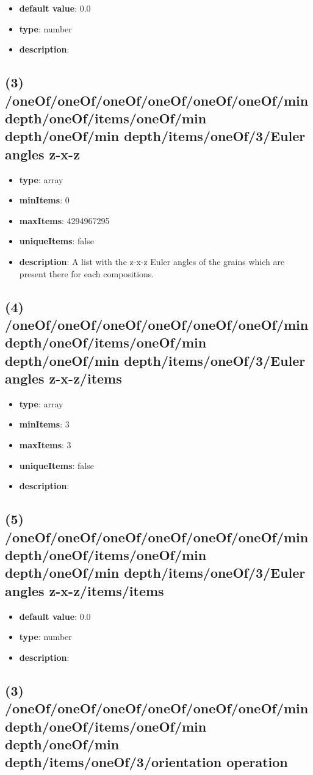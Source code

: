 \begin{itemize}[leftmargin=6em]\item {\bf default value}: 0.0
\item {\bf type}: number
\item {\bf description}: 
\end{itemize}\subsection{(3) /oneOf/oneOf/oneOf/oneOf/oneOf/oneOf/min depth/oneOf/items/oneOf/min depth/oneOf/min depth/items/oneOf/3/Euler angles z-x-z}
\begin{itemize}[leftmargin=3em]\item {\bf type}: array
\item {\bf minItems}: 0
\item {\bf maxItems}: 4294967295
\item {\bf uniqueItems}: false
\item {\bf description}: A list with the z-x-z Euler angles of the grains which are present there for each compositions.
\end{itemize}\subsection{(4) /oneOf/oneOf/oneOf/oneOf/oneOf/oneOf/min depth/oneOf/items/oneOf/min depth/oneOf/min depth/items/oneOf/3/Euler angles z-x-z/items}
\begin{itemize}[leftmargin=4em]\item {\bf type}: array
\item {\bf minItems}: 3
\item {\bf maxItems}: 3
\item {\bf uniqueItems}: false
\item {\bf description}: 
\end{itemize}\subsection{(5) /oneOf/oneOf/oneOf/oneOf/oneOf/oneOf/min depth/oneOf/items/oneOf/min depth/oneOf/min depth/items/oneOf/3/Euler angles z-x-z/items/items}
\begin{itemize}[leftmargin=5em]\item {\bf default value}: 0.0
\item {\bf type}: number
\item {\bf description}: 
\end{itemize}\subsection{(3) /oneOf/oneOf/oneOf/oneOf/oneOf/oneOf/min depth/oneOf/items/oneOf/min depth/oneOf/min depth/items/oneOf/3/orientation operation}
